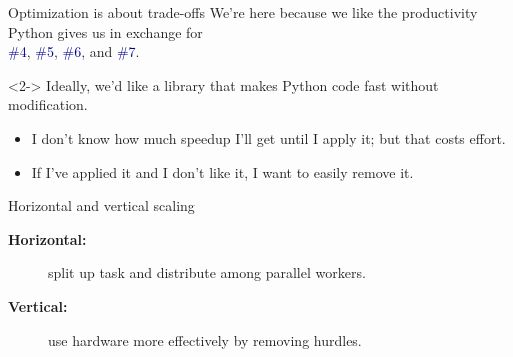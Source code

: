\documentclass[aspectratio=169]{beamer}
\begin{document}
\begin{frame}{Optimization is about trade-offs}
\large
\vspace{0.5 cm}
We're here because we like the productivity Python gives us in exchange for \\ \textcolor{darkblue}{\#4}, \textcolor{darkblue}{\#5}, \textcolor{darkblue}{\#6}, and \textcolor{darkblue}{\#7}.

\vspace{0.5 cm}
\begin{uncoverenv}<2->
Ideally, we'd like a library that makes Python code fast without modification.
\begin{itemize}
\item I don't know how much speedup I'll get until I apply it; but that costs effort.
\item If I've applied it and I don't like it, I want to easily remove it.
\end{itemize}
\end{uncoverenv}

\vspace{0.5 cm}

\vspace{0.2 cm}
\end{frame}

\begin{frame}{Horizontal and vertical scaling}
\Large
\vspace{0.5 cm}
\begin{description}
\item[\bf Horizontal:] split up task and distribute among parallel workers.
\end{description}

\large
{}

\vspace{1 cm}
\Large
\begin{description}
\item[\bf Vertical:] use hardware more effectively by removing hurdles.
\end{description}

\large
{}
\end{frame}
\end{document}
